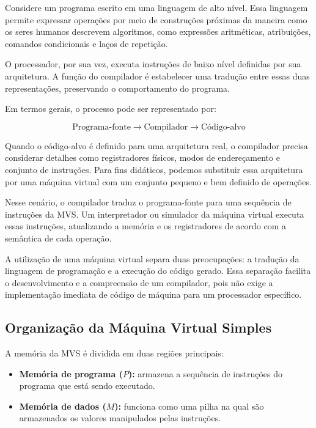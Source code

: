 \documentclass[
  brazilian,
  letterpaper,
]{book}
\providecommand{\tightlist}{%
  \setlength{\itemsep}{0pt}\setlength{\parskip}{0pt}}
\theoremstyle{plain}
\theoremstyle{definition}
\theoremstyle{remark}
\begin{document}
Considere um programa escrito em uma linguagem de alto nível. Essa
linguagem permite expressar operações por meio de construções próximas
da maneira como os seres humanos descrevem algoritmos, como expressões
aritméticas, atribuições, comandos condicionais e laços de repetição.

O processador, por sua vez, executa instruções de baixo nível definidas
por sua arquitetura. A função do compilador é estabelecer uma tradução
entre essas duas representações, preservando o comportamento do
programa.

Em termos gerais, o processo pode ser representado por:

\[
\text{Programa-fonte}
\longrightarrow
\text{Compilador}
\longrightarrow
\text{Código-alvo}
\]

Quando o código-alvo é definido para uma arquitetura real, o compilador
precisa considerar detalhes como registradores físicos, modos de
endereçamento e conjunto de instruções. Para fins didáticos, podemos
substituir essa arquitetura por uma máquina virtual com um conjunto
pequeno e bem definido de operações.

Nesse cenário, o compilador traduz o programa-fonte para uma sequência
de instruções da MVS. Um interpretador ou simulador da máquina virtual
executa essas instruções, atualizando a memória e os registradores de
acordo com a semântica de cada operação.

A utilização de uma máquina virtual separa duas preocupações: a tradução
da linguagem de programação e a execução do código gerado. Essa
separação facilita o desenvolvimento e a compreensão de um compilador,
pois não exige a implementação imediata de código de máquina para um
processador específico.

\subsection{Organização da Máquina Virtual
Simples}\label{organizauxe7uxe3o-da-muxe1quina-virtual-simples}

A memória da MVS é dividida em duas regiões principais:

\begin{itemize}
\tightlist
\item
  \textbf{Memória de programa (\(P\)):} armazena a sequência de
  instruções do programa que está sendo executado.
\item
  \textbf{Memória de dados (\(M\)):} funciona como uma pilha na qual são
  armazenados os valores manipulados pelas instruções.
\end{itemize}
\end{document}
